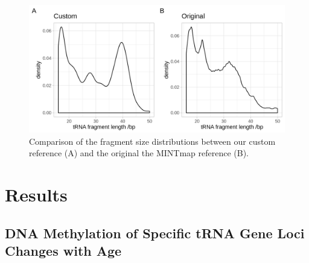 \documentclass[]{book}
\begin{document}
\begin{figure}

{\centering \includegraphics[width=1\linewidth]{./figs/combinedFragSizeDists} 

}

\caption{Comparison of the fragment size distributions between our custom reference (A) and the original the MINTmap reference (B).}\label{fig:combinedFragSizeDists}
\end{figure}



\newpage

\hypertarget{res}{%
\section{Results}\label{res}}

\hypertarget{dna-methylation-of-specific-trna-gene-loci-changes-with-age}{%
\subsection{DNA Methylation of Specific tRNA Gene Loci Changes with Age}\label{dna-methylation-of-specific-trna-gene-loci-changes-with-age}}
\end{document}
